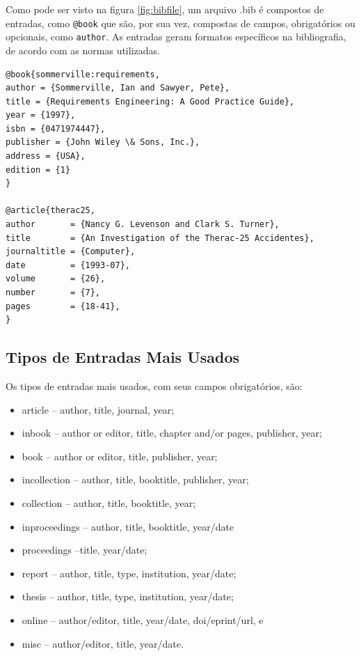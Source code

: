 Como pode ser visto na figura \ref{fig:bibfile}, um arquivo .bib é compostos de entradas, como \lstinline|@book| que são, por sua vez, compostas de campos, obrigatórios ou opcionais, como \lstinline|author|. As entradas geram formatos específicos na bibliografia, de acordo com as normas utilizadas.


\begin{lstlisting}[caption=Exemplo de arquivo .bib,label=fig:bibfile]
@book{sommerville:requirements,
author = {Sommerville, Ian and Sawyer, Pete},
title = {Requirements Engineering: A Good Practice Guide},
year = {1997},
isbn = {0471974447},
publisher = {John Wiley \& Sons, Inc.},
address = {USA},
edition = {1}
}

@article{therac25,
author       = {Nancy G. Levenson and Clark S. Turner},
title        = {An Investigation of the Therac-25 Accidentes},
journaltitle = {Computer},
date         = {1993-07},
volume       = {26},
number       = {7},
pages        = {18-41},
}
\end{lstlisting}



\subsection{Tipos de Entradas Mais Usados}

Os tipos de entradas mais usados, com seus campos obrigatórios, são\parencite{Kime:2019}:
\begin{itemize}
    \item article -- author, title, journal, year;
    \item inbook -- author or editor, title, chapter and/or pages, publisher, year;
    \item book -- author or editor, title, publisher, year;
    \item incollection -- author, title, booktitle, publisher, year;
    \item collection -- author, title, booktitle, year;
    \item inproceedings -- author, title, booktitle, year/date
    \item proceedings --title, year/date;
    \item report -- author, title, type, institution, year/date;
    \item thesis --  author, title, type, institution, year/date;
    \item online -- author/editor, title, year/date, doi/eprint/url, e
    \item misc -- author/editor, title, year/date.
\end{itemize}

